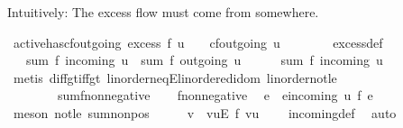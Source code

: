 \begin{isabellebody}
\begin{isamarkuptext}
  Intuitively: The excess flow must come from somewhere.%
\end{isamarkuptext}\isamarkuptrue%
\isamarkupfalse%
\ active{\isacharunderscore}has{\isacharunderscore}cf{\isacharunderscore}outgoing{\isacharcolon}\ {\isachardoublequoteopen}excess\ f\ u\ {\isachargreater}\ {}\ {\isasymLongrightarrow}\ cf{\isachardot}outgoing\ u\ {\isasymnoteq}\ {\isacharbraceleft}{\isacharbraceright}{\isachardoublequoteclose}\ \ \isanewline
%
\isadelimproof
\ \ %
\endisadelimproof
%
\isatagproof
{}\isamarkupfalse%
\ excess{\isacharunderscore}def\isanewline
{}\isamarkupfalse%
\ {\isacharminus}\isanewline
\ \ \isamarkupfalse%
\ {\isachardoublequoteopen}{}\ {\isacharless}\ sum\ f\ {\isacharparenleft}incoming\ u{\isacharparenright}\ {\isacharminus}\ sum\ f\ {\isacharparenleft}outgoing\ u{\isacharparenright}{\isachardoublequoteclose}\isanewline
\ \ \isamarkupfalse%
\ {\isachardoublequoteopen}{}\ {\isacharless}\ sum\ f\ {\isacharparenleft}incoming\ u{\isacharparenright}{\isachardoublequoteclose}\isanewline
\ \ \ \ \isamarkupfalse%
\ {\isacharparenleft}metis\ diff{\isacharunderscore}gt{\isacharunderscore}{}{\isacharunderscore}iff{\isacharunderscore}gt\ linorder{\isacharunderscore}neqE{\isacharunderscore}linordered{\isacharunderscore}idom\ linorder{\isacharunderscore}not{\isacharunderscore}le\ \isanewline
\ \ \ \ \ \ \ \ sum{\isacharunderscore}f{\isacharunderscore}non{\isacharunderscore}negative{\isacharparenright}\isanewline
\ \ \isamarkupfalse%
\ f{\isacharunderscore}non{\isacharunderscore}negative\ \isamarkupfalse%
\ e\ \ {\isachardoublequoteopen}e{\isasymin}incoming\ u{\isachardoublequoteclose}\ {\isachardoublequoteopen}f\ e\ {\isachargreater}\ {}{\isachardoublequoteclose}\isanewline
\ \ \ \ \isamarkupfalse%
\ {\isacharparenleft}meson\ not{\isacharunderscore}le\ sum{\isacharunderscore}nonpos{\isacharparenright}\isanewline
\ \ \isamarkupfalse%
\ \isamarkupfalse%
\ v\ \ {\isachardoublequoteopen}{\isacharparenleft}v{\isacharcomma}u{\isacharparenright}{\isasymin}E{\isachardoublequoteclose}\ {\isachardoublequoteopen}f\ {\isacharparenleft}v{\isacharcomma}u{\isacharparenright}\ {\isachargreater}\ {}{\isachardoublequoteclose}\ \isamarkupfalse%
\ incoming{\isacharunderscore}def\ \isamarkupfalse%
\ auto\isanewline
\ \ \isamarkupfalse%

\end{isabellebody}
